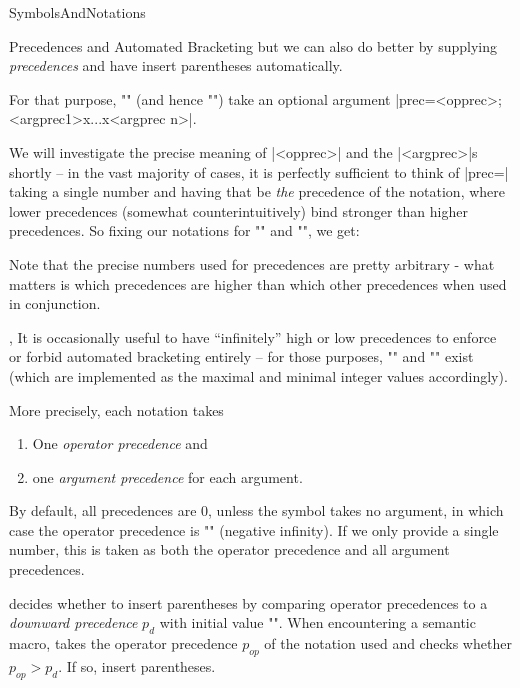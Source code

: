 \begin{smodule}[ns=https://github.com/slatex/sTeX/doc]{SymbolsAndNotations}
\begin{sfragment}{Precedences and Automated Bracketing}
but we can also do better by supplying \emph{precedences} and
have \sTeX insert parentheses automatically.

For that purpose, \stexcode"\notation" (and hence \stexcode"\symdef") take an optional
argument |prec=<opprec>;<argprec1>x...x<argprec n>|.

We will investigate the precise meaning of |<opprec>| and the |<argprec>|s shortly -- in
the vast majority of cases, it is perfectly sufficient to think of |prec=| taking a single
number and having that be \emph{the} precedence of the notation, where lower precedences
(somewhat counterintuitively) bind stronger than higher precedences.  So fixing our
notations for \stexcode"\addition" and \stexcode"\multiplication", we get:


Note that the precise numbers used for precedences are pretty arbitrary - what matters is
which precedences are higher than which other precedences when used in conjunction.
\begin{variable}{\infprec,\neginfprec}
  It is occasionally useful to have ``infinitely'' high or low precedences to enforce or
  forbid automated bracketing entirely -- for those purposes, \stexcode"\infprec" and
  \stexcode"\neginfprec" exist (which are implemented as the maximal and minimal integer
  values accordingly).
\end{variable}

\begin{dangerbox}
  More precisely, each notation takes
  \begin{enumerate}
  \item One \emph{operator precedence} and
  \item one \emph{argument precedence} for each argument.
  \end{enumerate}
  By default, all precedences are $0$, unless the symbol takes no argument, in which case
  the operator precedence is \stexcode"\neginfprec" (negative infinity). If we only
  provide a single number, this is taken as both the operator precedence and all argument
  precedences.

  \sTeX decides whether to insert parentheses by comparing operator precedences to a
  \emph{downward precedence} $p_d$ with initial value \stexcode"\infprec".  When
  encountering a semantic macro, \sTeX takes the operator precedence $p_{op}$ of the
  notation used and checks whether $p_{op}>p_d$. If so, \sTeX insert parentheses.


\end{dangerbox}
\end{sfragment}
\end{smodule}
